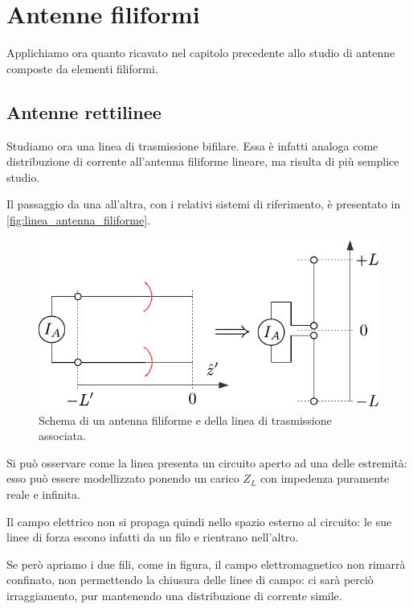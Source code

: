 \chapter{Antenne filiformi}

Applichiamo ora quanto ricavato nel capitolo precedente allo studio di antenne composte da elementi filiformi.

\section{Antenne rettilinee}
Studiamo ora una linea di trasmissione bifilare. Essa è infatti analoga come distribuzione di corrente all'antenna filiforme lineare, ma risulta di più semplice studio.

Il passaggio da una all'altra, con i relativi sistemi di riferimento, è presentato in \autoref{fig:linea_antenna_filiforme}.

\begin{figure}[htp]
	\centering
	\includegraphics[]{img/linea_antenna_filiforme.pdf}
	\caption{Schema di un antenna filiforme e della linea di trasmissione associata.}
	\label{fig:linea_antenna_filiforme}
\end{figure}

Si può osservare come la linea presenta un circuito aperto ad una delle estremità: esso può essere modellizzato ponendo un carico $Z_L$ con impedenza puramente reale e infinita.

Il campo elettrico non si propaga quindi nello spazio esterno al circuito: le sue linee di forza escono infatti da un filo e rientrano nell'altro.

Se però apriamo i due fili, come in figura, il campo elettromagnetico non rimarrà confinato, non permettendo la chiusura delle linee di campo: ci sarà perciò irraggiamento, pur mantenendo una distribuzione di corrente simile.

